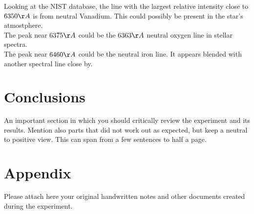 \documentclass[12pt,a4paper]{article}
\begin{document}
      Looking at the NIST database, the line with the largest relative intensity close to $6350 \AA$ is from neutral Vanadium. This could possibly be present in the star's atmostphere.\\ 

      The peak near $6375 \AA$ could be the $6363 \AA$ neutral oxygen line in stellar spectra.\\

      The peak near $6460 \AA$ could be the neutral iron line. It appears blended with another spectral line close by. 



\section{Conclusions}
An important section in which you should critically review the experiment and its results. Mention also parts that did not work out as expected, but keep a neutral to positive view. This can span from a few sentences to half a page.

\setcounter{secnumdepth}{0}

\printbibliography
\appendix
\section{Appendix}

Please attach here your original handwritten notes and other documents created during the experiment.
\end{document}
